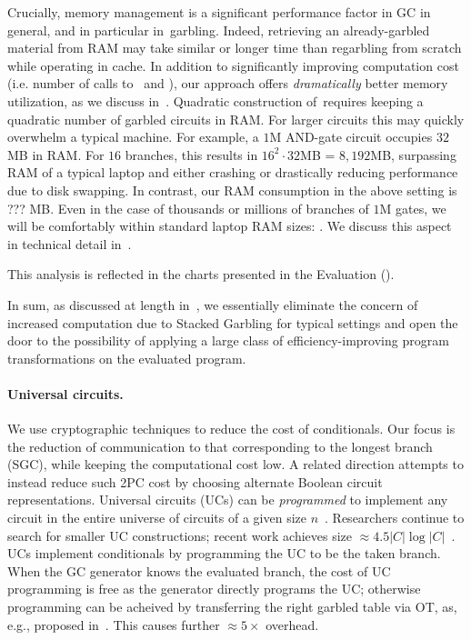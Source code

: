 Crucially, memory management is a significant performance factor in GC in general, and in particular in~\HK garbling.  Indeed, retrieving an already-garbled material from RAM may take similar or longer time than regarbling from scratch while operating in cache.
In addition to significantly improving computation cost (i.e. number of calls to \Gb\ and \Ev), our approach offers {\em dramatically} better memory utilization, as we discuss in~.  Quadratic construction of~\HK requires keeping a quadratic number of garbled circuits in RAM.  For larger circuits this may quickly overwhelm a typical machine.  For example, a $1$M AND-gate circuit occupies $32$MB in RAM.  For $16$ branches, this results in $16^2\cdot32$MB = $8,192$MB, surpassing RAM of a typical laptop and either crashing or drastically reducing performance due to disk swapping.  In contrast, our RAM consumption in the above setting is ??? MB. Even in the case of thousands or millions of branches of $1$M gates, we will be comfortably within standard laptop RAM sizes: .   We discuss this aspect in technical detail in~.

This analysis is reflected in the charts presented in the Evaluation ().   

In sum, as discussed at length in~, we essentially eliminate the concern of increased computation due to Stacked Garbling for typical settings 
and open the door to the possibility of applying a large class of efficiency-improving program transformations on the evaluated program.





 
 
 
\paragraph{Universal circuits.}

We use cryptographic techniques to reduce the cost of conditionals.  Our focus is the reduction of communication to that corresponding to the longest branch (SGC), while keeping the computational cost low.
A related direction attempts to instead reduce such 2PC cost by choosing alternate Boolean circuit representations.
Universal circuits (UCs) can be \emph{programmed} to implement any circuit in the entire universe of circuits of a given size $n$~\cite{STOC:Valiant76}.
Researchers continue to search for smaller UC constructions;
recent work achieves size $\approx 4.5 |C| \log |C|$~\cite{EPRINT:LipMohSad16,EC:KisSch16,AC:GunKisSch17,EPRINT:ZYZL19,EPRINT:AGKS19}.
%
UCs implement conditionals by programming the UC to be the taken branch. 
When the GC generator knows the evaluated branch, the cost of UC programming is free as the generator directly programs the UC; otherwise programming can be acheived by transferring the right garbled table via OT, as, e.g., proposed in~\cite{AC:KenKolWil17}.   This causes further $\approx 5\times$ overhead.

